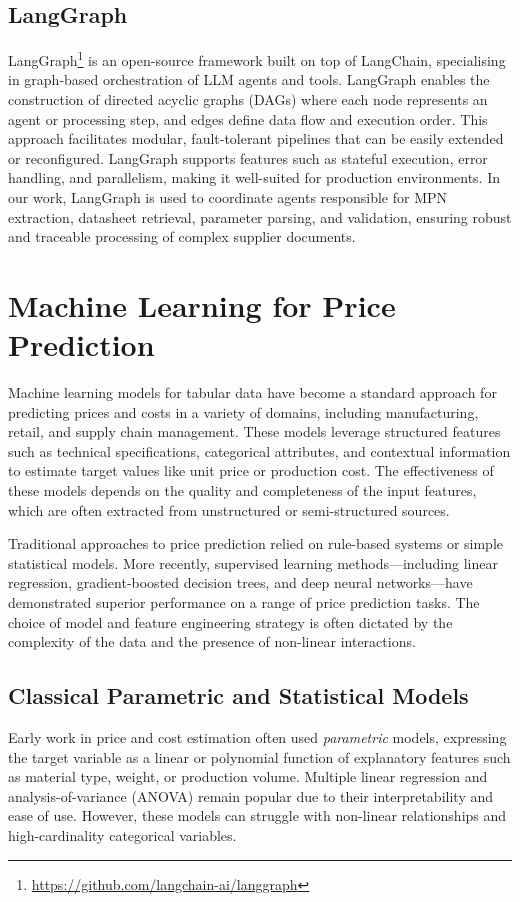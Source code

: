 \subsection{LangGraph}
LangGraph\footnote{\url{https://github.com/langchain-ai/langgraph}} is an open-source framework built on top of LangChain, specialising in graph-based orchestration of LLM agents and tools. LangGraph enables the construction of directed acyclic graphs (DAGs) where each node represents an agent or processing step, and edges define data flow and execution order. This approach facilitates modular, fault-tolerant pipelines that can be easily extended or reconfigured. LangGraph supports features such as stateful execution, error handling, and parallelism, making it well-suited for production environments. In our work, LangGraph is used to coordinate agents responsible for MPN extraction, datasheet retrieval, parameter parsing, and validation, ensuring robust and traceable processing of complex supplier documents.

\section{Machine Learning for Price Prediction}
Machine learning models for tabular data have become a standard approach for predicting prices and costs in a variety of domains, including manufacturing, retail, and supply chain management. These models leverage structured features such as technical specifications, categorical attributes, and contextual information to estimate target values like unit price or production cost. The effectiveness of these models depends on the quality and completeness of the input features, which are often extracted from unstructured or semi-structured sources.

Traditional approaches to price prediction relied on rule-based systems or simple statistical models. More recently, supervised learning methods—including linear regression, gradient-boosted decision trees, and deep neural networks—have demonstrated superior performance on a range of price prediction tasks. The choice of model and feature engineering strategy is often dictated by the complexity of the data and the presence of non-linear interactions.

\subsection{Classical Parametric and Statistical Models}
Early work in price and cost estimation often used \emph{parametric} models, expressing the target variable as a linear or polynomial function of explanatory features such as material type, weight, or production volume. Multiple linear regression and analysis-of-variance (ANOVA) remain popular due to their interpretability and ease of use. However, these models can struggle with non-linear relationships and high-cardinality categorical variables.

